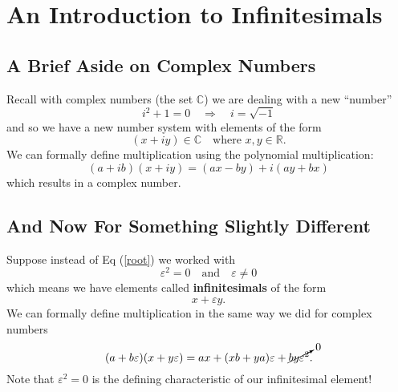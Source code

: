 \section{An Introduction to Infinitesimals}

\subsection{A Brief Aside on Complex Numbers}

Recall with complex numbers (the set $\mathbb{C}$) we are dealing with a new
``number''
\begin{equation}\label{root}
i^2 + 1 = 0\quad\Rightarrow\quad i = \sqrt{-1}
\end{equation}
and so we have a new number system with elements of the form
\begin{equation}
(x + iy)\in\mathbb{C}\quad\textrm{where }x,y\in\mathbb{R}.
\end{equation}
We can formally define multiplication using the polynomial multiplication:
\begin{equation}
(a + ib)(x + iy) = (ax - by) + i(ay + bx)
\end{equation}
which results in a complex number.

\subsection{And Now For Something Slightly Different}

Suppose instead of Eq (\ref{root}) we worked with
\begin{equation}
\varepsilon^2 = 0\quad\textrm{and}\quad\varepsilon\neq 0
\end{equation}
which means we have elements called \textbf{infinitesimals} of the form
\begin{equation*}
x + \varepsilon y.
\end{equation*}
We can formally define multiplication in the same way we did for complex 
numbers
\begin{equation}
(a + b\varepsilon)(x+y\varepsilon) = ax + (xb + ya)\varepsilon + \cancelto{0}{by\varepsilon^2}.
\end{equation}
Note that $\varepsilon^2=0$ is the defining characteristic of our infinitesimal element!

